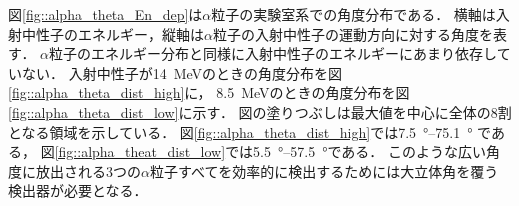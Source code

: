 \documentclass[../master]{subfiles}
\begin{document}
図\ref{fig::alpha_theta_En_dep}は$\alpha$粒子の実験室系での角度分布である．
横軸は入射中性子のエネルギー，縦軸は$\alpha$粒子の入射中性子の運動方向に対する角度を表す．
$\alpha$粒子のエネルギー分布と同様に入射中性子のエネルギーにあまり依存していない．
入射中性子が\SI{14}{\mega\electronvolt}のときの角度分布を図\ref{fig::alpha_theta_dist_high}に，
\SI{8.5}{\mega\electronvolt}のときの角度分布を図\ref{fig::alpha_theta_dist_low}に示す．
図の塗りつぶしは最大値を中心に全体の8割となる領域を示している．
図\ref{fig::alpha_theta_dist_high}では\SIrange{7.5}{75.1}{\degree} である，
図\ref{fig::alpha_theat_dist_low}では\SIrange{5.5}{57.5}{\degree}である．
このような広い角度に放出される3つの$\alpha$粒子すべてを効率的に検出するためには大立体角を覆う検出器が必要となる．
\end{document}
